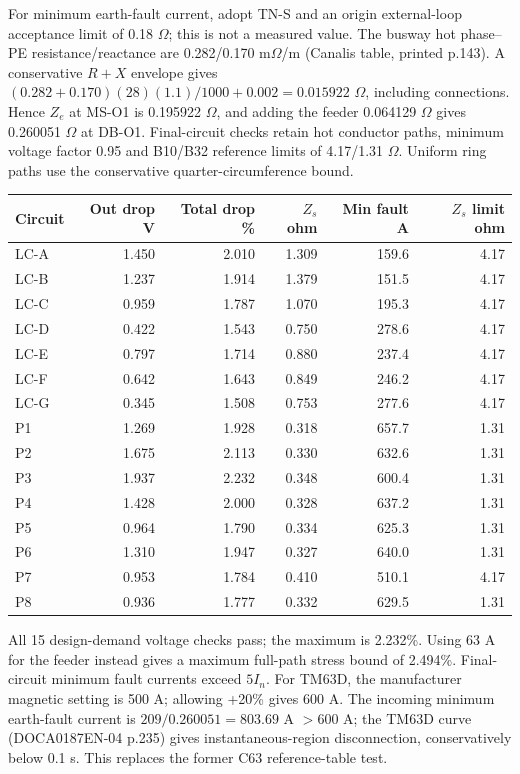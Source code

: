 For minimum earth-fault current, adopt TN-S and an origin external-loop acceptance limit of 0.18 $\Omega$; this is not a measured value. The busway hot phase--PE resistance/reactance are 0.282/0.170 m$\Omega$/m (Canalis table, printed p.143). A conservative $R+X$ envelope gives $(0.282+0.170)(28)(1.1)/1000+0.002=0.015922$ $\Omega$, including connections. Hence $Z_e$ at MS-O1 is 0.195922 $\Omega$, and adding the feeder 0.064129 $\Omega$ gives 0.260051 $\Omega$ at DB-O1. Final-circuit checks retain hot conductor paths, minimum voltage factor 0.95 and B10/B32 reference limits of 4.17/1.31 $\Omega$. Uniform ring paths use the conservative quarter-circumference bound.
\begingroup\small\renewcommand{\arraystretch}{1.0}
\begin{longtable}{lrrrrr}\toprule
Circuit & Out drop V & Total drop \% & $Z_s$ ohm & Min fault A & $Z_s$ limit ohm\\\midrule\endhead
LC-A & 1.450 & 2.010 & 1.309 & 159.6 & 4.17 \\
LC-B & 1.237 & 1.914 & 1.379 & 151.5 & 4.17 \\
LC-C & 0.959 & 1.787 & 1.070 & 195.3 & 4.17 \\
LC-D & 0.422 & 1.543 & 0.750 & 278.6 & 4.17 \\
LC-E & 0.797 & 1.714 & 0.880 & 237.4 & 4.17 \\
LC-F & 0.642 & 1.643 & 0.849 & 246.2 & 4.17 \\
LC-G & 0.345 & 1.508 & 0.753 & 277.6 & 4.17 \\
P1 & 1.269 & 1.928 & 0.318 & 657.7 & 1.31 \\
P2 & 1.675 & 2.113 & 0.330 & 632.6 & 1.31 \\
P3 & 1.937 & 2.232 & 0.348 & 600.4 & 1.31 \\
P4 & 1.428 & 2.000 & 0.328 & 637.2 & 1.31 \\
P5 & 0.964 & 1.790 & 0.334 & 625.3 & 1.31 \\
P6 & 1.310 & 1.947 & 0.327 & 640.0 & 1.31 \\
P7 & 0.953 & 1.784 & 0.410 & 510.1 & 4.17 \\
P8 & 0.936 & 1.777 & 0.332 & 629.5 & 1.31 \\
\bottomrule\end{longtable}
\endgroup
All 15 design-demand voltage checks pass; the maximum is 2.232\%. Using 63 A for the feeder instead gives a maximum full-path stress bound of 2.494\%. Final-circuit minimum fault currents exceed $5I_n$. For TM63D, the manufacturer magnetic setting is 500 A; allowing +20\% gives 600 A. The incoming minimum earth-fault current is $209/0.260051=803.69$ A $>600$ A; the TM63D curve (DOCA0187EN-04 p.235) gives instantaneous-region disconnection, conservatively below 0.1 s. This replaces the former C63 reference-table test.
